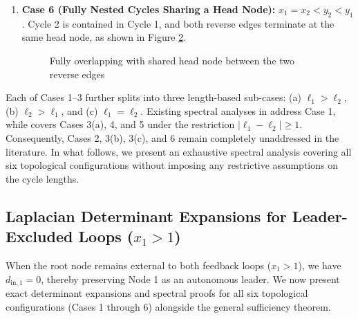 \begin{enumerate}
\begin{figure}[ht!]
{}
		\caption{Fully overlapping with shared tail node between the two reverse edges}
		\label{Case5}
	\end{figure}
	\item \textbf{Case 6 (Fully Nested Cycles Sharing a Head Node):} $x_1 = x_2 < y_2 < y_1$. Cycle 2 is contained in Cycle 1, and both reverse edges terminate at the same head node, as shown in Figure \ref{Case6}.
    \begin{figure}[ht!]
		\centering
		\caption{Fully overlapping with shared head node between the two reverse edges}
		\label{Case6}
	\end{figure}
\end{enumerate}
Each of Cases 1–3 further splits into three length-based sub-cases: (a) $\ell_1 > \ell_2$, (b) $\ell_2 > \ell_1$, and (c) $\ell_1 = \ell_2$. Existing spectral analyses in \cite{zhang2017effect} address Case 1, while \cite{hao2019role} covers Cases 3(a), 4, and 5 under the restriction $|\ell_1 - \ell_2| \ge 1$. Consequently, Cases 2, 3(b), 3(c), and 6 remain completely unaddressed in the literature. In what follows, we present an exhaustive spectral analysis covering all six topological configurations without imposing any restrictive assumptions on the cycle lengths.

\subsection{Laplacian Determinant Expansions for Leader-Excluded Loops ($x_1 > 1$)}
When the root node remains external to both feedback loops ($x_1 > 1$), we have $d_{\text{in}, 1} = 0$, thereby preserving Node 1 as an autonomous leader. We now present exact determinant expansions and spectral proofs for all six topological configurations (Cases 1 through 6) alongside the general sufficiency theorem.

